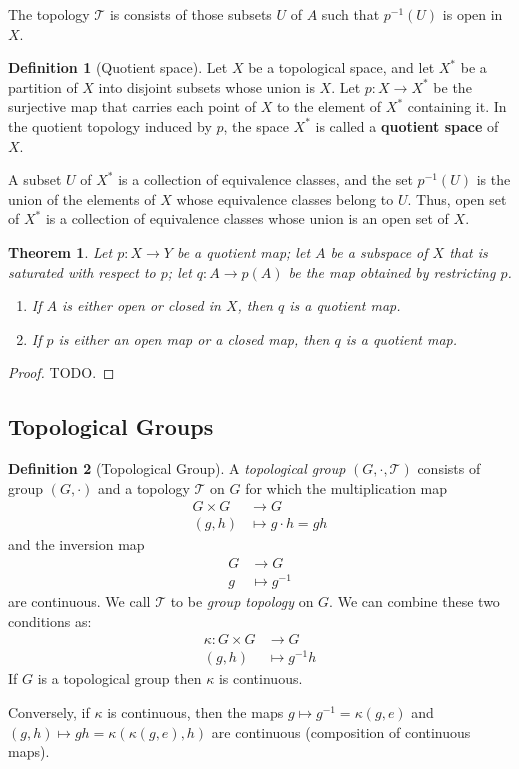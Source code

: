 \documentclass[12pt,reqno]{amsart}
\theoremstyle{plain}
\newtheorem{thm}{Theorem}
\theoremstyle{definition}
\newtheorem{defn}{Definition}
\newcommand{\cal}[1]{\mathcal{#1}}
\begin{document}
The topology $\cal T$ is consists of those subsets $U$ of $A$ such that $p^{-1}(U)$ is open in $X$.

\begin{defn}[Quotient space]
    Let $X$ be a topological space, and let $X^*$ be a partition of $X$ into disjoint subsets whose union is $X$. Let $p : X \to X^*$ be the surjective map that carries each point of $X$ to the element of $X^*$ containing it. In the quotient topology induced by $p$, the space $X^*$ is called a {\bf quotient space} of $X$.
\end{defn}
A subset $U$ of $X^*$ is a collection of equivalence classes, and the set $p^{-1}(U)$ is the union of the elements of $X$ whose equivalence classes belong to $U$. Thus, open set of $X^*$ is a collection of equivalence classes whose union is an open set of $X$.

\begin{thm}
    Let $p : X \to Y$ be a quotient map; let $A$ be a subspace of $X$ that is saturated with respect to $p$; let $q : A \to p(A)$ be the map obtained by restricting $p$.
    \begin{enumerate}
        \item If $A$ is either open or closed in $X$, then $q$ is a quotient map.
        \item If $p$ is either an open map or a closed map, then $q$ is a quotient map.
    \end{enumerate}
\end{thm}
\begin{proof}
    TODO.
\end{proof}

\subsection{Topological Groups}
\begin{defn}[Topological Group]
    A {\it topological group} $(G,\cdot,\cal T)$ consists of group $(G,\cdot)$ and a topology $\cal T$ on $G$ for which the multiplication map
    $$
    \begin{aligned}
        G \times G &\to G \\
        (g,h) &\mapsto g \cdot h = gh
    \end{aligned} 
    $$
    and the inversion map
    $$
    \begin{aligned}
        G &\to G \\
        g &\mapsto g^{-1}
    \end{aligned} 
    $$
    are continuous. We call $\cal T$ to be {\it group topology} on $G$. We can combine these two conditions as:
    $$
    \begin{aligned}
        \kappa \colon G \times G &\to G \\
        (g,h) &\mapsto g^{-1}h
    \end{aligned} 
    $$
    If $G$ is a topological group then $\kappa$ is continuous.
\end{defn}
Conversely, if $\kappa$ is continuous, then the maps $g \mapsto g^{-1} = \kappa(g,e)$ and $(g,h) \mapsto gh = \kappa(\kappa(g,e),h)$ are continuous (composition of continuous maps).
\end{document}

